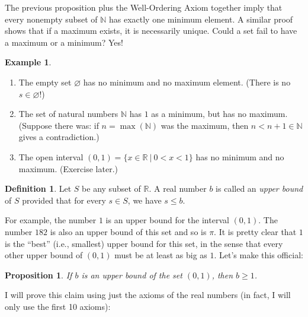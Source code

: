 \documentclass[12pt]{amsart}
\newcommand{\R}{{\mathbb{R}}}
\newcommand{\N}{\mathbb{N}}
\numberwithin{equation}{section}
\theoremstyle{plain} %
\newtheorem{prop}[equation]{Proposition}
\theoremstyle{definition}
\newtheorem{defn}[equation]{Definition}
\newtheorem{ex}[equation]{Example}
\theoremstyle{remark}
\begin{document}
The previous proposition plus the Well-Ordering Axiom together imply that every nonempty subset of $\N$ has exactly one minimum element. A similar proof shows that if a maximum exists, it is necessarily unique. Could a set fail to have a maximum or a minimum? Yes!

\begin{ex}
\begin{enumerate}
\item The empty set $\varnothing$ has no minimum and no maximum element. (There is no $s\in \varnothing$!)
\item The set of natural numbers $\N$ has $1$ as a minimum, but has no maximum. (Suppose there was: if $n=\max(\N)$ was the maximum, then $n<n+1\in \N$ gives a contradiction.)
\item The open interval $(0,1)=\{ x\in \R \ | \ 0 < x < 1\}$ has no minimum and no maximum. (Exercise later.)
\end{enumerate}
\end{ex}




\begin{defn} Let $S$ be any subset of $\R$. A real number $b$ is called an  {\em upper bound} of $S$ provided that for every $s \in S$,
we have $s \leq b$. 
\end{defn}


For example, the number $1$ is an upper bound for the interval $(0,1)$. The number $182$ is also an upper bound of this set and so is $\pi$. It is pretty clear
that $1$ is the ``best'' (i.e., smallest) upper bound for this set, in the sense that every other upper bound of $(0,1)$ must be at least as
big as $1$. Let's make this official:

\begin{prop}  If $b$ is an upper bound of the set $(0,1)$, then $b \geq 1$.
\end{prop}

I will prove this claim using just the axioms of the real numbers (in fact, I will only use the first 10 axioms):
\end{document}
